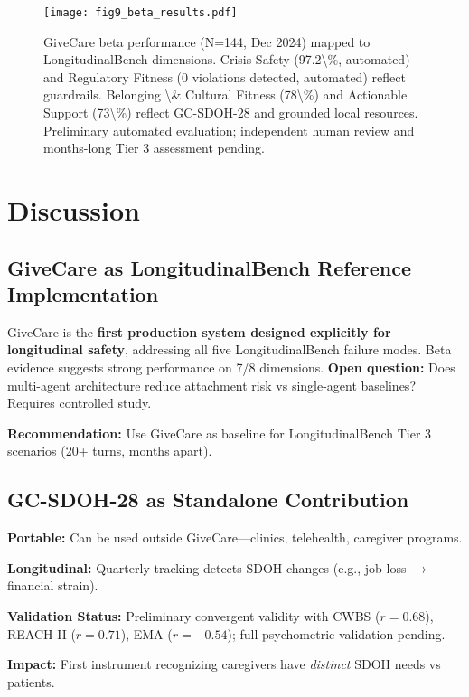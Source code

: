 \documentclass{article}
\begin{document}
%
\begin{figure}[htbp]%
\centering%
\texttt{[image: fig9\_beta\_results.pdf]}%
\caption{GiveCare beta performance (N=144, Dec 2024) mapped to LongitudinalBench dimensions. Crisis Safety (97.2\textbackslash{}\%, automated) and Regulatory Fitness (0 violations detected, automated) reflect guardrails. Belonging \textbackslash{}\& Cultural Fitness (78\textbackslash{}\%) and Actionable Support (73\textbackslash{}\%) reflect GC{-}SDOH{-}28 and grounded local resources. Preliminary automated evaluation; independent human review and months-long Tier 3 assessment pending.}%
\label{fig:beta}%
\end{figure}%
\section{Discussion}%
\label{sec:Discussion}%
%
\subsection{GiveCare as LongitudinalBench Reference Implementation}%
\label{subsec:GiveCareasLongitudinalBenchReferenceImplementation}%
GiveCare is the \textbf{first production system designed explicitly for longitudinal safety}, addressing all five LongitudinalBench failure modes. Beta evidence suggests strong performance on 7/8 dimensions. \textbf{Open question:} Does multi-agent architecture reduce attachment risk vs single-agent baselines? Requires controlled study.

\textbf{Recommendation:} Use GiveCare as baseline for LongitudinalBench Tier 3 scenarios (20+ turns, months apart).

%
\subsection{GC{-}SDOH{-}28 as Standalone Contribution}%
\label{subsec:GC{-}SDOH{-}28asStandaloneContribution}%
\textbf{Portable:} Can be used outside GiveCare—clinics, telehealth, caregiver programs.

\textbf{Longitudinal:} Quarterly tracking detects SDOH changes (e.g., job loss $\rightarrow$ financial strain).

\textbf{Validation Status:} Preliminary convergent validity with CWBS ($r=0.68$), REACH-II ($r=0.71$), EMA ($r=-0.54$); full psychometric validation pending.

\textbf{Impact:} First instrument recognizing caregivers have \textit{distinct} SDOH needs vs patients.
\end{document}
